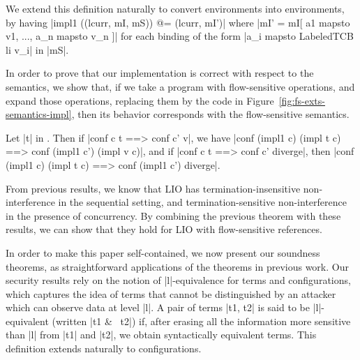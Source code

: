 We extend this definition naturally to convert \liofs{} environments into
\lio{} environments, by having |impl1 ((lcurr, mI, mS)) @= (lcurr, mI')|
where |mI' = mI[ a1 mapsto v1, ..., a_n mapsto v_n ]| for each binding
of the form |a_i mapsto LabeledTCB li v_i| in |mS|.

In order to prove that our implementation is correct with respect to
the semantics, we show that, if we take a program with flow-sensitive
operations, and expand those operations, replacing them by the code in
Figure~\ref{fig:fs-exts-semantics-impl}, then its behavior corresponds
with the flow-sensitive semantics.




\begin{theorem}\label{thm:eq} Let |t| in \liofs{}.
  Then if |conf c t ==> conf c' v|, we have |conf (impl1 c) (impl t c)
  ==> conf (impl1 c') (impl v c)|, and if 
  |conf c t ==> conf c' diverge|, then
  |conf (impl1 c) (impl t c) ==> conf (impl1 c') diverge|.
\end{theorem}

From previous results, we know that LIO has termination-insensitive
non-interference in the sequential setting, and termination-sensitive
non-interference in the presence of concurrency. By combining the previous
theorem with these results, we can show that they hold for LIO with
flow-sensitive references.

In order to make this paper self-contained, we now present our
soundness theorems, as straightforward applications of the theorems in
previous work. Our security results rely on the notion of
|l|-equivalence for terms and configurations, which captures the idea
of terms that cannot be distinguished by an attacker which can observe
data at level |l|. A pair of terms |t1, t2| is said to be
|l|-equivalent (written |t1 &~ t2|) if, after erasing all the
information more sensitive than |l| from |t1| and |t2|, we obtain
syntactically equivalent terms. This definition extends naturally to
configurations.

